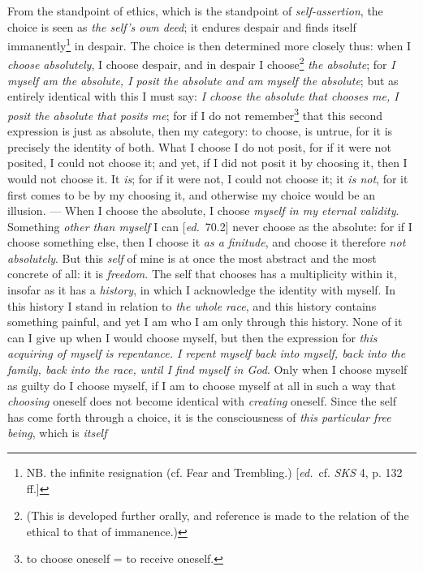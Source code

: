 \documentclass[12pt,a4paper,openany]{book}
\newcommand{\kpage}[1]{\marginnote{\footnotesize\textit{[#1]}}}
\newcommand{\ed}[1]{{\small[\textit{ed.}\ #1]}}
\begin{document}
From the standpoint of ethics, which is the standpoint of \emph{self-assertion}, the
choice is seen as \emph{the self's own deed}; it endures despair and finds
itself immanently\footnote[57]{NB. the infinite resignation (cf. Fear and Trembling.) \ed{cf. \emph{SKS} 4, p. 132 ff.}} in despair. The choice is then determined more closely
thus: when I \emph{choose absolutely}, I choose despair, and in despair
I choose\footnote[58]{(This is developed further orally, and reference is made to the relation of the ethical to
that of immanence.)} \emph{the absolute}; for \emph{I myself am the absolute, I posit the absolute
and am myself the absolute}; but as entirely identical with this I must
say: \emph{I choose the absolute that chooses me, I posit the absolute that posits
me}; for if I do not remember\footnote[59]{to choose oneself = to receive oneself.} that this second expression is just as absolute,
then my category: to choose, is untrue, for it is precisely the identity of
both. What I choose I do not posit, for if it were not
posited, I could not choose it; and yet, if I did not posit it
by choosing it, then I would not choose it. It \emph{is}; for if
it were not, I could not choose it; it \emph{is not}, for it first comes to be
by my choosing it, and otherwise my choice would be an illusion. --- When
I choose the absolute, I choose \emph{myself in my eternal validity}. Something
\emph{other than myself} I can \ed{70.2} never choose as the absolute: for
if I choose something else, then I choose it \emph{as a finitude}, and choose
\kpage{132}it therefore \emph{not absolutely}. But this \emph{self} of mine is at once the
most abstract and the most concrete of all: it is \emph{freedom}. The self that
chooses has a multiplicity within it, insofar as it has a \emph{history}, in
which I acknowledge the identity with myself. In this history
I stand in relation to \emph{the whole race}, and this history contains
something painful, and yet I am who I am only through this history.
None of it can I give up when I would choose myself, but then
the expression for \emph{this acquiring of myself is repentance. I repent myself back into
myself, back into the family, back into the race, until I find myself in God}. Only
when I choose myself as guilty do I choose myself, if I am
to choose myself at all in such a way that \emph{choosing} oneself does not
become identical with \emph{creating} oneself. Since the self has come forth
through a choice, it is the consciousness of \emph{this particular free being}, which is \emph{itself}
\end{document}
